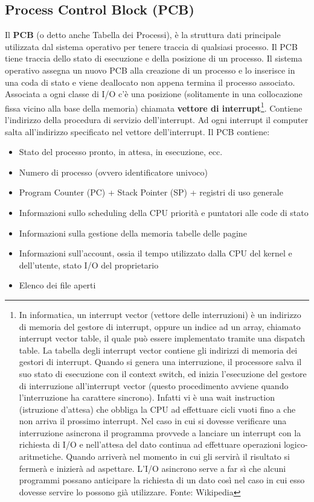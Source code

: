 \documentclass{article}
\begin{document}
\subsection{Process Control Block (PCB)}
Il \textbf{PCB} (o detto anche Tabella dei Processi), è la struttura dati principale utilizzata dal sistema operativo per tenere traccia di qualsiasi processo. Il PCB tiene traccia dello stato di esecuzione e della posizione di un processo. Il sistema operativo assegna un nuovo PCB alla creazione di un processo e lo inserisce in una coda di stato e viene deallocato non appena termina il processo associato. \\Associata a ogni classe di I/O c'è una posizione (solitamente in una collocazione fissa vicino alla base della memoria) chiamata \textbf{vettore di interrupt}\footnote{In informatica, un interrupt vector (vettore delle interruzioni) è un indirizzo di memoria del gestore di interrupt, oppure un indice ad un array, chiamato interrupt vector table, il quale può essere implementato tramite una dispatch table. La tabella degli interrupt vector contiene gli indirizzi di memoria dei gestori di interrupt. Quando si genera una interruzione, il processore salva il suo stato di esecuzione con il context switch, ed inizia l'esecuzione del gestore di interruzione all'interrupt vector (questo procedimento avviene quando l'interruzione ha carattere sincrono). Infatti vi è una wait instruction (istruzione d'attesa) che obbliga la CPU ad effettuare cicli vuoti fino a che non arriva il prossimo interrupt. Nel caso in cui si dovesse verificare una interruzione asincrona il programma provvede a lanciare un interrupt con la richiesta di I/O e nell'attesa del dato continua ad effettuare operazioni logico-aritmetiche. Quando arriverà nel momento in cui gli servirà il risultato si fermerà e inizierà ad aspettare. L'I/O asincrono serve a far sì che alcuni programmi possano anticipare la richiesta di un dato così nel caso in cui esso dovesse servire lo possono già utilizzare. Fonte: Wikipedia}. Contiene l'indirizzo della procedura di servizio dell'interrupt. Ad ogni interrupt il computer salta all'indirizzo specificato nel vettore dell'interrupt. 
Il PCB contiene:
\begin{itemize}
    \item Stato del processo pronto, in attesa, in esecuzione, ecc.
    \item Numero di processo (ovvero identificatore univoco)
    \item Program Counter (PC) + Stack Pointer (SP) + registri di uso generale 
    \item Informazioni sullo scheduling della CPU priorità e puntatori alle code di stato 
    \item Informazioni sulla gestione della memoria tabelle delle pagine
    \item Informazioni sull'account, ossia il  tempo utilizzato dalla CPU del kernel e dell'utente, stato I/O del proprietario 
    \item Elenco dei file aperti
\end{itemize}
\end{document}
